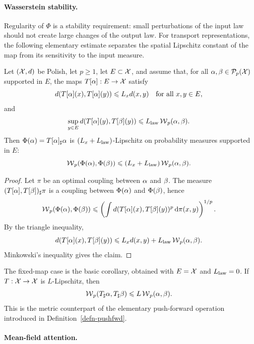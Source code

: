 \paragraph{Wasserstein stability.}

Regularity of $\Phi$ is a stability requirement: small perturbations of the input law should not create large changes of the output law. For transport representations, the following elementary estimate separates the spatial Lipschitz constant of the map from its sensitivity to the input measure.

\begin{prop}\label{prop-measure-map-wass-lipschitz}
		Let $(\mathcal{X},d)$ be Polish, let $p\geq1$, let $E\subset\mathcal{X}$, and assume that, for all $\alpha,\beta\in\mathcal{P}_p(\mathcal{X})$ supported in $E$, the maps $T[\alpha]:E\to\mathcal{X}$ satisfy
	\[
		d(T[\alpha](x),T[\alpha](y)) \leqslant L_x d(x,y)
		\quad\text{for all }x,y\in E,
	\]
	and
	\[
		\sup_{y\in E} d(T[\alpha](y),T[\beta](y))
		\leqslant L_{\rm law} \operatorname{\mathcal{W}}_p(\alpha,\beta).
		\]
		Then $\Phi(\alpha)=T[\alpha]_\sharp\alpha$ is $(L_x+L_{\rm law})$-Lipschitz on probability measures supported in $E$:
	\[
		\operatorname{\mathcal{W}}_p(\Phi(\alpha),\Phi(\beta))
		\leqslant
			(L_x+L_{\rm law})\operatorname{\mathcal{W}}_p(\alpha,\beta).
	\]
\end{prop}
\begin{proof}
	Let $\pi$ be an optimal coupling between $\alpha$ and $\beta$. The measure $(T[\alpha],T[\beta])_\sharp\pi$ is a coupling between $\Phi(\alpha)$ and $\Phi(\beta)$, hence
	\[
		\operatorname{\mathcal{W}}_p(\Phi(\alpha),\Phi(\beta))
		\leqslant
		\left(
		\int d(T[\alpha](x),T[\beta](y))^p\,\mathrm{d}\pi(x,y)
		\right)^{1/p}.
	\]
	By the triangle inequality,
	\[
		d(T[\alpha](x),T[\beta](y))
		\leqslant
			L_x d(x,y)+L_{\rm law}\operatorname{\mathcal{W}}_p(\alpha,\beta).
	\]
	Minkowski's inequality gives the claim.
\end{proof}

The fixed-map case is the basic corollary, obtained with $E=\mathcal{X}$ and $L_{\rm law}=0$. If $T:\mathcal{X}\to\mathcal{X}$ is $L$-Lipschitz, then
\[
	\operatorname{\mathcal{W}}_p(T_\sharp\alpha,T_\sharp\beta)\leqslant L\operatorname{\mathcal{W}}_p(\alpha,\beta).
\]
This is the metric counterpart of the elementary push-forward operation introduced in Definition~\ref{defn-pushfwd}.

\paragraph{Mean-field attention.}\label{par-mean-field-attention}

